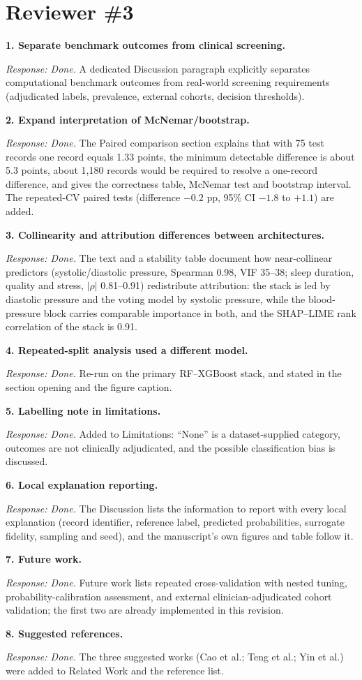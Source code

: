 \documentclass[11pt,a4paper]{article}
\newcommand{\rc}[2]{\par\medskip\noindent\textbf{#1}\par\noindent\textit{Response: Done.} #2\par}
\begin{document}
\section*{Reviewer \#3}
\rc{1. Separate benchmark outcomes from clinical screening.}{A dedicated Discussion paragraph explicitly separates computational benchmark outcomes from real-world screening requirements (adjudicated labels, prevalence, external cohorts, decision thresholds).}
\rc{2. Expand interpretation of McNemar/bootstrap.}{The Paired comparison section explains that with 75 test records one record equals 1.33 points, the minimum detectable difference is about 5.3 points, about 1{,}180 records would be required to resolve a one-record difference, and gives the correctness table, McNemar test and bootstrap interval. The repeated-CV paired tests (difference $-0.2$ pp, 95\% CI $-1.8$ to $+1.1$) are added.}
\rc{3. Collinearity and attribution differences between architectures.}{The text and a stability table document how near-collinear predictors (systolic/diastolic pressure, Spearman 0.98, VIF 35--38; sleep duration, quality and stress, $|\rho|$ 0.81--0.91) redistribute attribution: the stack is led by diastolic pressure and the voting model by systolic pressure, while the blood-pressure block carries comparable importance in both, and the SHAP--LIME rank correlation of the stack is 0.91.}
\rc{4. Repeated-split analysis used a different model.}{Re-run on the primary RF--XGBoost stack, and stated in the section opening and the figure caption.}
\rc{5. Labelling note in limitations.}{Added to Limitations: ``None'' is a dataset-supplied category, outcomes are not clinically adjudicated, and the possible classification bias is discussed.}
\rc{6. Local explanation reporting.}{The Discussion lists the information to report with every local explanation (record identifier, reference label, predicted probabilities, surrogate fidelity, sampling and seed), and the manuscript's own figures and table follow it.}
\rc{7. Future work.}{Future work lists repeated cross-validation with nested tuning, probability-calibration assessment, and external clinician-adjudicated cohort validation; the first two are already implemented in this revision.}
\rc{8. Suggested references.}{The three suggested works (Cao et al.; Teng et al.; Yin et al.) were added to Related Work and the reference list.}
\end{document}
